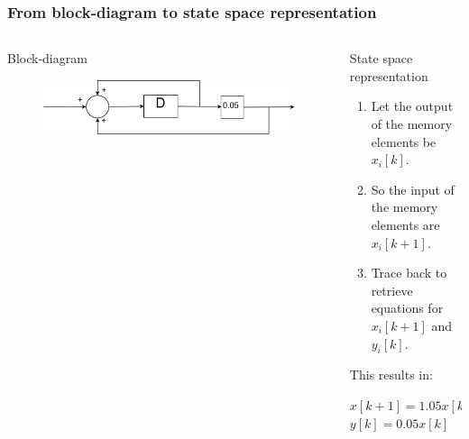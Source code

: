 \begin{frame}
\frametitle{From block-diagram to state space representation}
\begin{columns}

\begin{column}{0.5\textwidth}
	\begin{block}{Block-diagram}
		\vspace{2.3em}
		\begin{figure}
			\centering
			\includegraphics[width=1\linewidth]{Images/Discrete_time_eps_14}
		\end{figure}
		\vspace{2.3em}
	\end{block}
	
\end{column}
\begin{column}{0.5\textwidth}
	\begin{block}{State space representation}
		\begin{enumerate}
			\item Let the output of the memory elements be $x_{i}[k]$. 
			\item So the input of the memory elements are $x_i[k+1]$.
			\item Trace back to retrieve equations for $x_i[k+1] $ and $y_i[k]$.
		\end{enumerate}
		\vspace{-0.5em}
		This results in:
		\vspace{-0.5em}
		\begin{center}
				$x[k+1] = 1.05 x[k] + u[k]$
				$y[k] = 0.05 x[k]$
		\end{center}
	\end{block}
\end{column}
\end{columns}
\end{frame}
